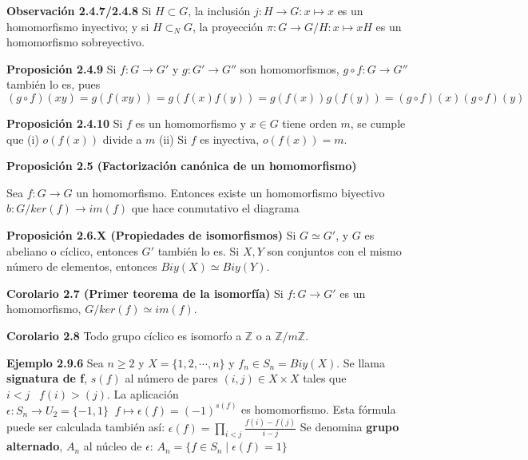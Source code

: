 \documentclass[a4paper, 11pt]{extarticle}
\newcommand{\propo}[1]{\textcolor{rojo}{\textbf{Proposición #1}}}
\newcommand{\obs}[1]{\textcolor{verde}{\textbf{Observación #1}}}
\newcommand{\ejem}[1]{\textcolor{verde}{\textbf{Ejemplo #1}}}
\newcommand{\cor}[1]{\textcolor{rosa}{\textbf{Corolario #1}}}
\begin{document}
\obs{2.4.7/2.4.8} Si \(H \subset G\), la inclusión \(j: H \rightarrow  G: x \mapsto x\) es un homomorfismo inyectivo; y si \(H \subset_N G\), la proyección \(\pi: G \rightarrow  G/H : x \mapsto xH\) es un homomorfismo sobreyectivo.

\propo{2.4.9} Si \(f: G \rightarrow G'\) y \(g: G' \rightarrow G''\) son homomorfismos, \(g \circ f: G \rightarrow G''\) también lo es, pues \((g \circ f)(xy) = g(f(xy)) = g(f(x)f(y)) =
g(f(x))g(f(y)) = (g \circ f)(x) (g \circ f)(y)\)

\propo{2.4.10} Si \(f\) es un homomorfismo y \(x \in G\) tiene orden \(m\), se cumple que (i) \(o(f(x))\) divide a \(m\)  (ii) Si \(f\) es
inyectiva, \(o(f(x)) = m\).

\propo{2.5 (Factorización canónica de un homomorfismo)}

Sea \(f: G \rightarrow G\) un homomorfismo. Entonces existe un homomorfismo biyectivo \(b: G/ker(f) \rightarrow im(f)\) que hace conmutativo el diagrama

\vspace{-2em}
\begin{center}
\end{center}
\vspace{-2em}

\propo{2.6.X (Propiedades de isomorfismos)} Si \(G \simeq G'\), y \(G\) es
abeliano o cíclico, entonces \(G'\) también lo es. Si \(X,Y\) son conjuntos
con el mismo número de elementos, entonces \(Biy(X) \simeq Biy(Y)\).

\cor{2.7 (Primer teorema de la isomorfía)} Si \(f: G \rightarrow  G'\) es un homomorfismo, \(G/ker(f) \simeq im(f)\).

\cor{2.8} Todo grupo cíclico es isomorfo a \(\mathbb{Z}\) o a \(\mathbb{Z}/m \mathbb{Z}.\)

\ejem{2.9.6} Sea \(n \ge 2\) y \(X = \{ 1, 2, \cdots, n \}\) y \(f_n \in
S_n = Biy(X)\). Se llama \textbf{signatura de f}, \(s(f)\) al número de pares \((i,j)
\in X \times X\) tales que \(i < j\;\;\; f(i) > (j)\).
La aplicación \(\epsilon: S_n \rightarrow U_2 = \{ -1,1 \}\;\; f \mapsto
\epsilon (f) = (-1)^{s(f)}\)
es homomorfismo. Esta fórmula puede ser calculada también así:
\(\epsilon (f) = \prod_{i < j}^{} \frac{f(i) - f(j)}{i-j}\)
Se denomina \textbf{grupo alternado}, \(A_n\) al núcleo de \(\epsilon\): \(A_n = \{
f \in S_n \;|\; \epsilon (f) = 1\}\)
\end{document}

